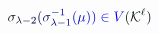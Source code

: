 \documentclass[12pt]{article}
\begin{document}
\makeatletter
\renewcommand*{\@textcolor}[3]{%
  \protect\leavevmode
  \begingroup
    \color#1{#2}#3%
  \endgroup
}
\makeatother
\begin{displaymath}
\mathcolor[RGB]{0,0,15}{\sigma} _ { \mathcolor[RGB]{0,0,30}{\lambda} \mathcolor[RGB]{0,0,45}{-} \mathcolor[RGB]{0,0,60}{2} } \mathcolor[RGB]{0,0,75}{(} \mathcolor[RGB]{0,0,90}{\sigma} _ { \mathcolor[RGB]{0,0,105}{\lambda} \mathcolor[RGB]{0,0,120}{-} \mathcolor[RGB]{0,0,135}{1} } ^ { \mathcolor[RGB]{0,0,150}{-} \mathcolor[RGB]{0,0,165}{1} } \mathcolor[RGB]{0,0,180}{(} \mathcolor[RGB]{0,0,195}{\mu} \mathcolor[RGB]{0,0,210}{)} \mathcolor[RGB]{0,0,225}{)} \mathcolor[RGB]{0,0,240}{\in} \mathcolor[RGB]{0,0,255}{V} \mathcolor[RGB]{0,15,0}{(} \mathcal { \mathcolor[RGB]{0,15,15}{K} } ^ { \mathcolor[RGB]{0,15,30}{\ell} } \mathcolor[RGB]{0,15,45}{)}
\end{displaymath}
\end{document}
